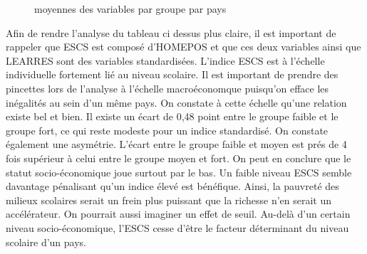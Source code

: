 \documentclass[
  french,
  11pt,
  a4paper,
]{report}
\begin{document}
\begin{figure}


\caption{\label{fig-15}moyennes des variables par groupe par pays}

\end{figure}%

Afin de rendre l'analyse du tableau ci dessus plus claire, il est
important de rappeler que ESCS est composé d'HOMEPOS et que ces deux
variables ainsi que LEARRES sont des variables standardisées. L'indice
ESCS est à l'échelle individuelle fortement lié au niveau scolaire. Il
est important de prendre des pincettes lors de l'analyse à l'échelle
macroéconomque puisqu'on efface les inégalités au sein d'un même pays.
On constate à cette échelle qu'une relation existe bel et bien. Il
existe un écart de 0,48 point entre le groupe faible et le groupe fort,
ce qui reste modeste pour un indice standardisé. On constate également
une asymétrie. L'écart entre le groupe faible et moyen est prés de 4
fois supérieur à celui entre le groupe moyen et fort. On peut en
conclure que le statut socio-économique joue surtout par le bas. Un
faible niveau ESCS semble davantage pénalisant qu'un indice élevé est
bénéfique. Ainsi, la pauvreté des milieux scolaires serait un frein plus
puissant que la richesse n'en serait un accélérateur. On pourrait aussi
imaginer un effet de seuil. Au-delà d'un certain niveau
socio-économique, l'ESCS cesse d'être le facteur déterminant du niveau
scolaire d'un pays.
\end{document}
